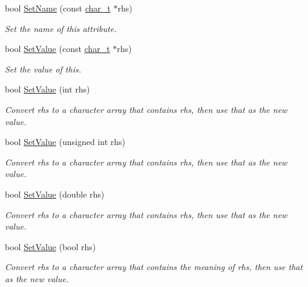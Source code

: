 \begin{DoxyCompactItemize}
bool \hyperlink{classphys_1_1xml_1_1Attribute_af669654308122897f98858563375bf4c}{SetName} (const \hyperlink{namespacephys_1_1xml_afc87705cd1c2917d87b879715a2d8f6e}{char\_\-t} $\ast$rhs)
\begin{DoxyCompactList}\small\item\em Set the name of this attribute. \item\end{DoxyCompactList}\item 
bool \hyperlink{classphys_1_1xml_1_1Attribute_a470512fcd8b4f7609319bf85df100aaa}{SetValue} (const \hyperlink{namespacephys_1_1xml_afc87705cd1c2917d87b879715a2d8f6e}{char\_\-t} $\ast$rhs)
\begin{DoxyCompactList}\small\item\em Set the value of this. \item\end{DoxyCompactList}\item 
bool \hyperlink{classphys_1_1xml_1_1Attribute_a693f7bd8015866c3c4979101c343ce50}{SetValue} (int rhs)
\begin{DoxyCompactList}\small\item\em Convert rhs to a character array that contains rhs, then use that as the new value. \item\end{DoxyCompactList}\item 
bool \hyperlink{classphys_1_1xml_1_1Attribute_a289ac36b218f3912224fd904ccade1ed}{SetValue} (unsigned int rhs)
\begin{DoxyCompactList}\small\item\em Convert rhs to a character array that contains rhs, then use that as the new value. \item\end{DoxyCompactList}\item 
bool \hyperlink{classphys_1_1xml_1_1Attribute_a919034671f61ee408d616409a49dafca}{SetValue} (double rhs)
\begin{DoxyCompactList}\small\item\em Convert rhs to a character array that contains rhs, then use that as the new value. \item\end{DoxyCompactList}\item 
bool \hyperlink{classphys_1_1xml_1_1Attribute_a6df4cf0f083482e69e4e6e94599a1d82}{SetValue} (bool rhs)
\begin{DoxyCompactList}\small\item\em Convert rhs to a character array that contains the meaning of rhs, then use that as the new value. \item\end{DoxyCompactList}\item 

\end{DoxyCompactItemize}
